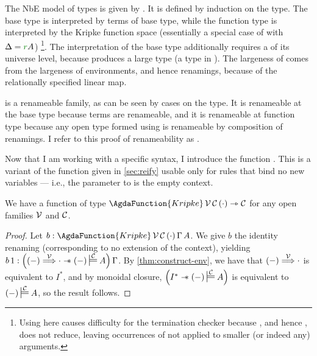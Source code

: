 
The NbE model of types is given by \AgdaFunction{\_$\vDash$\_}.
It is defined by induction on the type.
The base type is interpreted by terms of base type, while
the function type is interpreted by the Kripke function space (essentially a
special case of  with $\Delta = \gr rA$)
\footnote{
  Using
   \AgdaFunction{\_$\vDash\_$} \AgdaFunction{\_$\vDash\_$}
  here causes difficulty for the termination checker because
  , and hence , does not reduce, leaving
  occurrences of \AgdaFunction{\_$\vDash\_$} not applied to smaller (or indeed
  any) arguments.
}.
The interpretation of the base type additionally requires a 
of its universe level, because  produces a large type
(a type in ).
The largeness of  comes from the largeness of
environments, and hence renamings, because of the relationally specified linear
map.


\AgdaFunction{\_$\vDash$\_} is a renameable family, as can be seen by cases on
the type.
It is renameable at the base type because terms are renameable, and it is
renameable at function type because any open type formed using
 is renameable by composition of renamings.
I refer to this proof of renameability as
.

Now that I am working with a specific syntax, I introduce the function
.
This is a variant of the  function given in \cref{sec:reify}
usable only for rules that bind no new variables --- i.e., the parameter
\AgdaBound{$\Delta$} to  is the empty context.

\begin{lemma}
  We have a function of type
  $\AgdaFunction{Kripke}\,\V\,\C\,\plr{\cdot} \rightarrowtriangle \C$ for any
  open families $\mathcal V$ and $\mathcal C$.
\end{lemma}
\begin{proof}
  Let $b : \AgdaFunction{Kripke}\,\V\,\C\,\plr{\cdot}\,\Gamma\,A$.
  We give $b$ the identity renaming (corresponding to no extension of the
  context), yielding
  $b\,1 : \plr{\plr{-} \env\V {\cdot} \wand \plr{-} \sdtstile{}\C A}\,\Gamma$.
  By \cref{thm:construct-env}, we have that $\plr{-} \env\V {\cdot}$ is
  equivalent to $I^*$, and by monoidal closure,
  $\plr{I^* \wand \plr{-} \sdtstile{}\C A}$ is equivalent to
  $\plr{-} \sdtstile{}\C A$, so the result follows.
\end{proof}

